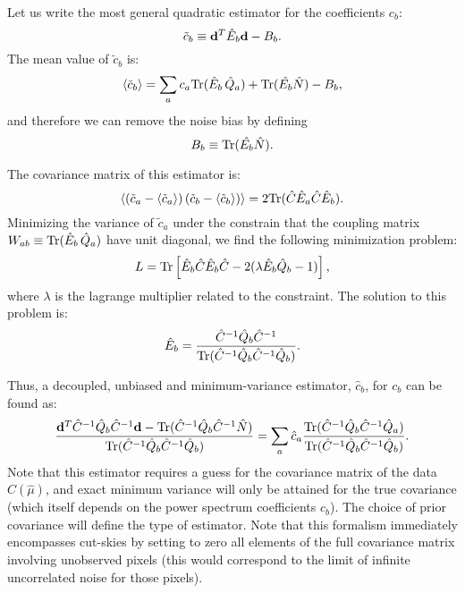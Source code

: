 \documentclass[a4paper,10pt]{article}
\newcommand{\Tr}{{\rm Tr}}
\begin{document}
Let us write the most general quadratic estimator for the coefficients $c_b$:
\begin{equation}
 \tilde{c}_b\equiv {\bf d}^T\hat{E}_b{\bf d}-B_b.
\end{equation}
The mean value of $\tilde{c}_b$ is:
\begin{equation}
 \langle\tilde{c}_b\rangle=\sum_a c_a\Tr(\hat{E}_b\,\hat{Q}_a)+\Tr(\hat{E_b}\hat{N})-B_b,
\end{equation}
and therefore we can remove the noise bias by defining
\begin{equation}
  B_b\equiv\Tr(\hat{E_b}\hat{N}).
\end{equation}

The covariance matrix of this estimator is:
\begin{equation}
 \left\langle(\tilde{c}_a-\langle\tilde{c}_a\rangle)\,(\tilde{c}_b-\langle\tilde{c}_b\rangle)\right\rangle=2\Tr(\hat{C}\hat{E}_a\hat{C}\hat{E}_b).
\end{equation}
Minimizing the variance of $\tilde{c}_a$ under the constrain that the coupling matrix $W_{ab}\equiv\Tr(\hat{E}_b\,\hat{Q}_a)$ have unit
diagonal, we find the following minimization problem:
\begin{equation}
  L=\Tr\left[\hat{E}_b\hat{C}\hat{E}_b\hat{C}-2(\lambda\hat{E}_b\hat{Q}_b-1)\right],
\end{equation}
where $\lambda$ is the lagrange multiplier related to the constraint. The solution to this problem is:
\begin{equation}
 \hat{E}_b=\frac{\hat{C}^{-1}\hat{Q}_b\hat{C}^{-1}}{\Tr(\hat{C}^{-1}\hat{Q}_b\hat{C}^{-1}\hat{Q}_b)}.
\end{equation}

Thus, a decoupled, unbiased and minimum-variance estimator, $\hat{c}_b$, for $c_b$ can be found as:
\begin{equation}
 \frac{{\bf d}^T\hat{C}^{-1}\hat{Q}_b\hat{C}^{-1}{\bf d}-\Tr(\hat{C}^{-1}\hat{Q}_b\hat{C}^{-1}\hat{N})}
 {\Tr(\hat{C}^{-1}\hat{Q}_b\hat{C}^{-1}\hat{Q}_b)}
 =\sum_a \hat{c}_a\frac{\Tr(\hat{C}^{-1}\hat{Q}_b\hat{C}^{-1}\hat{Q}_a)}
 {\Tr(\hat{C}^{-1}\hat{Q}_b\hat{C}^{-1}\hat{Q}_b)}.
\end{equation}
Note that this estimator requires a guess for the covariance matrix of the data $C(\hat{\mu})$, and exact
minimum variance will only be attained for the true covariance (which itself depends on the power spectrum coefficients $c_b$).
The choice of prior covariance will define the type of estimator. Note that this formalism immediately encompasses cut-skies by
setting to zero all elements of the full covariance matrix involving unobserved pixels (this would correspond to the limit of
infinite uncorrelated noise for those pixels).
\end{document}
